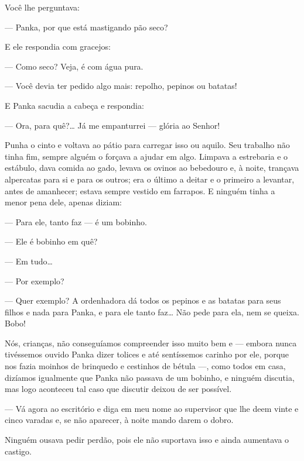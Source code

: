 Você lhe perguntava:

--- Panka, por que está mastigando pão seco?

E ele respondia com gracejos:

--- Como seco? Veja, é com água pura.

--- Você devia ter pedido algo mais: repolho, pepinos ou batatas!

E Panka sacudia a cabeça e respondia:

--- Ora, para quê?\ldots{} Já me empanturrei --- glória ao Senhor!

Punha o cinto e voltava ao pátio para carregar isso ou aquilo. Seu
trabalho não tinha fim, sempre alguém o forçava a ajudar em algo.
Limpava a estrebaria e o estábulo, dava comida ao gado, levava os ovinos
ao bebedouro e, à noite, trançava alpercatas para si e para os outros;
era o último a deitar e o primeiro a levantar, antes de amanhecer;
estava sempre vestido em farrapos. E ninguém tinha a menor pena dele, apenas
diziam:

--- Para ele, tanto faz --- é um bobinho.

--- Ele é bobinho em quê?

--- Em tudo\ldots{}

--- Por exemplo?

--- Quer exemplo? A ordenhadora dá todos os pepinos e as batatas para
seus filhos e nada para Panka, e para ele tanto faz\ldots{} Não pede para
ela, nem se queixa. Bobo!

Nós, crianças, não conseguíamos compreender isso muito bem e --- embora
nunca tivéssemos ouvido Panka dizer tolices e até sentíssemos carinho
por ele, porque nos fazia moinhos de brinquedo e cestinhos de bétula ---, como todos em casa, dizíamos igualmente que Panka não passava de
um bobinho, e ninguém discutia, mas logo aconteceu tal caso que discutir deixou de ser possível.


--- Vá agora ao escritório e diga em meu nome ao supervisor que lhe deem
vinte e cinco varadas e, se não aparecer, à noite mando darem o dobro.

Ninguém ousava pedir perdão, pois ele não suportava isso e ainda
aumentava o castigo.


